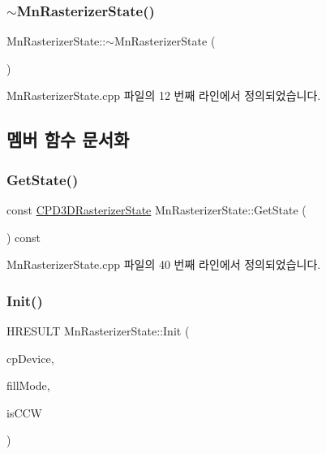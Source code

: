 \subsubsection{\texorpdfstring{$\sim$\+Mn\+Rasterizer\+State()}{~MnRasterizerState()}}
{\footnotesize\ttfamily Mn\+Rasterizer\+State\+::$\sim$\+Mn\+Rasterizer\+State (\begin{DoxyParamCaption}{ }\end{DoxyParamCaption})}



Mn\+Rasterizer\+State.\+cpp 파일의 12 번째 라인에서 정의되었습니다.



\subsection{멤버 함수 문서화}
\mbox{\label{class_m_n_l_1_1_mn_rasterizer_state_a91cc6f6e2f11441d31ae75f2c9d65807}} 
\subsubsection{\texorpdfstring{Get\+State()}{GetState()}}
{\footnotesize\ttfamily const \hyperlink{namespace_m_n_l_aa6c2682c64c5b58c458c36bb424f1e56}{C\+P\+D3\+D\+Rasterizer\+State} Mn\+Rasterizer\+State\+::\+Get\+State (\begin{DoxyParamCaption}{ }\end{DoxyParamCaption}) const}



Mn\+Rasterizer\+State.\+cpp 파일의 40 번째 라인에서 정의되었습니다.

\mbox{\label{class_m_n_l_1_1_mn_rasterizer_state_a543c1ca2173258a0af7bbf0cd0e16922}} 
\subsubsection{\texorpdfstring{Init()}{Init()}}
{\footnotesize\ttfamily H\+R\+E\+S\+U\+LT Mn\+Rasterizer\+State\+::\+Init (\begin{DoxyParamCaption}\item[{\hyperlink{namespace_m_n_l_a1eec210db8f309a4a9ac0d9658784c31}{C\+P\+D3\+D\+Device}}]{cp\+Device,  }\item[{D3\+D11\+\_\+\+F\+I\+L\+L\+\_\+\+M\+O\+DE}]{fill\+Mode,  }\item[{bool}]{is\+C\+CW }\end{DoxyParamCaption})}




